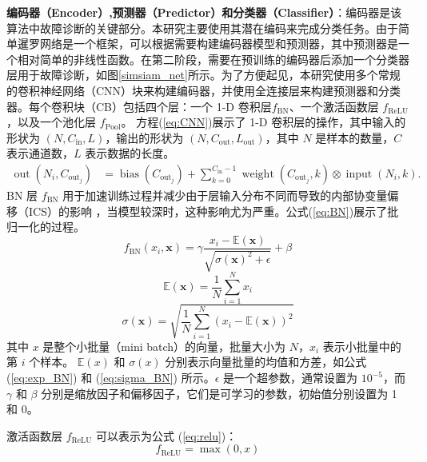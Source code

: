 \documentclass[master]{thesis-uestc}
\begin{document}
\textbf{编码器（Encoder）,预测器（Predictor）和分类器（Classifier）}：编码器是该算法中故障诊断的关键部分。本研究主要使用其潜在编码来完成分类任务。由于简单暹罗网络是一个框架，可以根据需要构建编码器模型和预测器，其中预测器是一个相对简单的非线性函数。在第二阶段，需要在预训练的编码器后添加一个分类器层用于故障诊断，如图\ref{simsiam_net}所示。为了方便起见，本研究使用多个常规的卷积神经网络（CNN）块来构建编码器，并使用全连接层来构建预测器和分类器。每个卷积块（CB）包括四个层：一个 1-D 卷积层\( f_{\text{BN}} \)、一个激活函数层 \( f_{\text{ReLU}} \)，以及一个池化层 \( f_{\text{Pool}} \)。 方程(\ref{eq:CNN})展示了 1-D 卷积层的操作，其中输入的形状为 \( (N, C_{\text{in}}, L) \)，输出的形状为 \( (N, C_{\text{out}}, L_{\text{out}}) \)，其中 \( N \) 是样本的数量，\( C \) 表示通道数，\( L \) 表示数据的长度。
\begin{equation}
    \begin{aligned}
    \operatorname{out}(N_i, C_{\mathrm{out}_j}) &= \operatorname{bias}(C_{\mathrm{out}_j}) + \sum_{k=0}^{C_{\mathrm{in}}-1} \operatorname{weight}(C_{\mathrm{out}_j}, k) \otimes \operatorname{input}(N_i, k).
    \end{aligned}
    \label{eq:CNN}
    \end{equation}
BN 层 \( f_{\text{BN}} \) 用于加速训练过程并减少由于层输入分布不同而导致的内部协变量偏移（ICS）的影响 ，当模型较深时，这种影响尤为严重。公式(\ref{eq:BN})展示了批归一化的过程。
\begin{equation}
    f_{\text{BN}}(x_i, \mathbf{x}) = \gamma \frac{x_i - \mathbb{E}(\mathbf{x})}{\sqrt{\sigma(\mathbf{x})^2 + \epsilon}} + \beta
\label{eq:BN}
\end{equation}    
\begin{equation}
\mathbb{E}(\mathbf{x}) = \frac{1}{N}\sum_{i=1}^N x_i
\label{eq:exp_BN}
\end{equation}
\begin{equation}
\sigma(\mathbf{x}) = \sqrt{\frac{1}{N}\sum_{i=1}^N (x_i - \mathbb{E}(\mathbf{x}))^2}
\label{eq:sigma_BN}
\end{equation}
其中 \( x \) 是整个小批量（mini batch）的向量，批量大小为 \( N \)，\( x_i \) 表示小批量中的第 \( i \) 个样本。  
\( \mathbb{E}(x) \) 和 \( \sigma(x) \) 分别表示向量批量的均值和方差，如公式 (\ref{eq:exp_BN}) 和 (\ref{eq:sigma_BN}) 所示。\( \epsilon \) 是一个超参数，通常设置为 \( 10^{-5} \)，而 \( \gamma \) 和 \( \beta \) 分别是缩放因子和偏移因子，它们是可学习的参数，初始值分别设置为 1 和 0。

激活函数层 \( f_{\text{ReLU}} \) 可以表示为公式 (\ref{eq:relu})：
\begin{equation}
    f_{\text{ReLU}} = \max(0, x)
    \label{eq:relu}
\end{equation}
\end{document}
